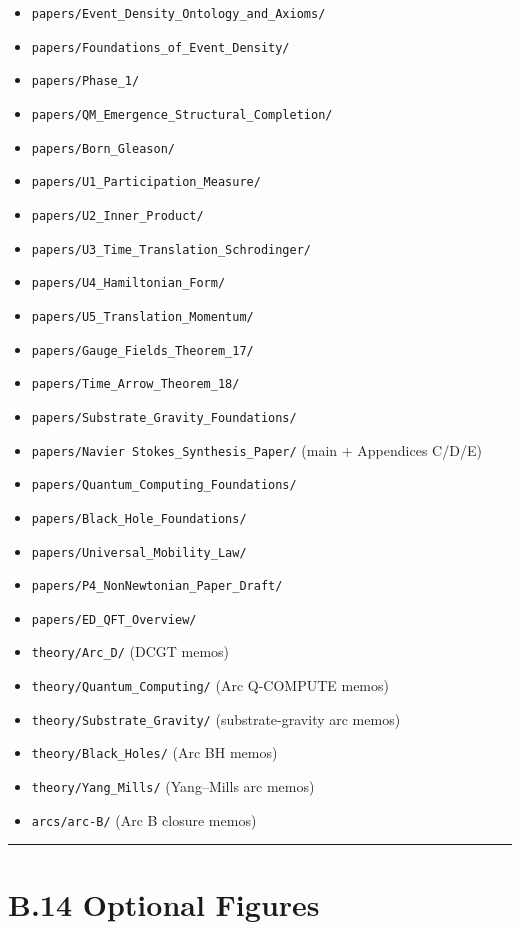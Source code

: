\documentclass[11pt]{book}
\begin{document}
\begin{itemize}
\item \texttt{papers/Event\_Density\_Ontology\_and\_Axioms/}
\item \texttt{papers/Foundations\_of\_Event\_Density/}
\item \texttt{papers/Phase\_1/}
\item \texttt{papers/QM\_Emergence\_Structural\_Completion/}
\item \texttt{papers/Born\_Gleason/}
\item \texttt{papers/U1\_Participation\_Measure/}
\item \texttt{papers/U2\_Inner\_Product/}
\item \texttt{papers/U3\_Time\_Translation\_Schrodinger/}
\item \texttt{papers/U4\_Hamiltonian\_Form/}
\item \texttt{papers/U5\_Translation\_Momentum/}
\item \texttt{papers/Gauge\_Fields\_Theorem\_17/}
\item \texttt{papers/Time\_Arrow\_Theorem\_18/}
\item \texttt{papers/Substrate\_Gravity\_Foundations/}
\item \texttt{papers/Navier Stokes\_Synthesis\_Paper/} (main + Appendices C/D/E)
\item \texttt{papers/Quantum\_Computing\_Foundations/}
\item \texttt{papers/Black\_Hole\_Foundations/}
\item \texttt{papers/Universal\_Mobility\_Law/}
\item \texttt{papers/P4\_NonNewtonian\_Paper\_Draft/}
\item \texttt{papers/ED\_QFT\_Overview/}
\item \texttt{theory/Arc\_D/} (DCGT memos)
\item \texttt{theory/Quantum\_Computing/} (Arc Q-COMPUTE memos)
\item \texttt{theory/Substrate\_Gravity/} (substrate-gravity arc memos)
\item \texttt{theory/Black\_Holes/} (Arc BH memos)
\item \texttt{theory/Yang\_Mills/} (Yang–Mills arc memos)
\item \texttt{arcs/arc-B/} (Arc B closure memos)
\end{itemize}

\bigskip\hrule\bigskip

\section{B.14 Optional Figures}
\end{document}
